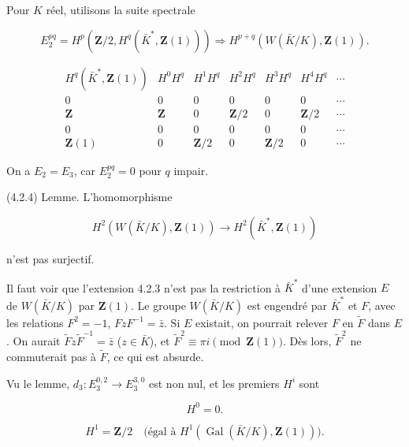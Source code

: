 \documentclass[9pt,twoside]{extarticle}
\begin{document}
{Pour \(K\) réel, utilisons la suite spectrale\par

\[
E_2^{pq}=H^p(\mathbf Z/2,H^q(\bar K^*,\mathbf Z(1)))\Rightarrow H^{p+q}(W(\bar K/K),\mathbf Z(1)).
\]

\[
\begin{array}{c|cccccc}
H^q(\bar K^*,\mathbf Z(1)) & H^0H^q & H^1H^q & H^2H^q & H^3H^q & H^4H^q & \cdots\\ \hline
0            & 0         & 0           & 0           & 0           & 0           & \cdots\\
\mathbf Z    & \mathbf Z & 0           & \mathbf Z/2 & 0           & \mathbf Z/2 & \cdots\\
0            & 0         & 0           & 0           & 0           & 0           & \cdots\\
\mathbf Z(1) & 0         & \mathbf Z/2 & 0           & \mathbf Z/2 & 0           & \cdots
\end{array}
\]

On a \(E_2=E_3\), car \(E_2^{pq}=0\) pour \(q\) impair.\par

(4.2.4) Lemme. L’homomorphisme\par

\[
H^2(W(\bar K/K),\mathbf Z(1))\longrightarrow H^2(\bar K^*,\mathbf Z(1))
\]

n’est pas surjectif.\par

Il faut voir que l’extension 4.2.3 n’est pas la restriction à \(\bar K^*\) d’une extension \(E\) de \(W(\bar K/K)\) par \(\mathbf Z(1)\). Le groupe \(W(\bar K/K)\) est engendré par \(\bar K^*\) et \(F\), avec les relations \(F^2=-1\), \(FzF^{-1}=\bar z\). Si \(E\) existait, on pourrait relever \(F\) en \(\widetilde F\) dans \(E\). On aurait \(\widetilde Fz\widetilde F^{-1}=\bar z\) (\(z\in\bar K\)), et \(\widetilde F^2\equiv\pi i\pmod{\mathbf Z(1)}\). Dès lors, \(\widetilde F^2\) ne commuterait pas à \(\widetilde F\), ce qui est absurde.\par

Vu le lemme, \(d_3:E_3^{0,2}\to E_3^{3,0}\) est non nul, et les premiers \(H^i\) sont\par

\[
H^0=0.
\]

\[
H^1=\mathbf Z/2\quad\text{(égal à }H^1(\operatorname{Gal}(\bar K/K),\mathbf Z(1))\text{)}.
\]
}
\end{document}

